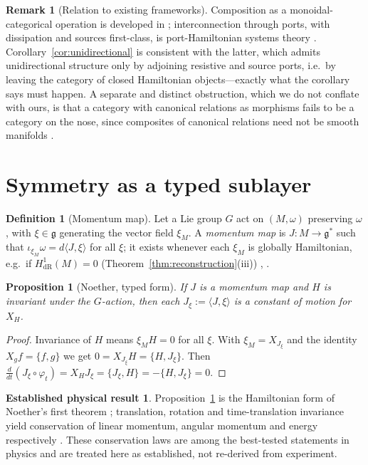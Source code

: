 \documentclass[10pt,a4paper]{article}
\theoremstyle{plain}
\newtheorem{proposition}[theorem]{Proposition}
\theoremstyle{definition}
\newtheorem{definition}[theorem]{Definition}
\newtheorem{established}[theorem]{Established physical result}
\newtheorem{remark}[theorem]{Remark}
\newcommand{\dR}{\mathrm{dR}}
\newcommand{\ins}{\iota}
\newcommand{\PB}[2]{\{#1,#2\}}
\begin{document}
\begin{remark}[Relation to existing frameworks]
\label{rem:related}
Composition as a monoidal-categorical operation is developed in \cite{BaezStay2011,CoeckeKissinger2017,FongSpivak2019}; interconnection through ports, with dissipation and sources first-class, is port-Hamiltonian systems theory \cite{vanderSchaftJeltsema2014}. Corollary~\ref{cor:unidirectional} is consistent with the latter, which admits unidirectional structure only by adjoining resistive and source ports, i.e.\ by leaving the category of closed Hamiltonian objects---exactly what the corollary says must happen. A separate and distinct obstruction, which we do not conflate with ours, is that a category with canonical relations as morphisms fails to be a category on the nose, since composites of canonical relations need not be smooth manifolds \cite{Weinstein2010}.
\end{remark}

\section{Symmetry as a typed sublayer}
\label{sec:symmetry}

\begin{definition}[Momentum map]
\label{def:momentum}
Let a Lie group $G$ act on $(M,\omega)$ preserving $\omega$, with $\xi \in \mathfrak{g}$ generating the vector field $\xi_M$. A \emph{momentum map} is $J: M \to \mathfrak{g}^*$ such that $\ins_{\xi_M}\omega = d\langle J,\xi\rangle$ for all $\xi$; it exists whenever each $\xi_M$ is globally Hamiltonian, e.g.\ if $H^1_{\dR}(M) = 0$ (Theorem~\ref{thm:reconstruction}(iii)) \cite[Ch.~11--12]{MarsdenRatiu1999}, \cite{Souriau1970}.
\end{definition}

\begin{proposition}[Noether, typed form]
\label{prop:noether}
If $J$ is a momentum map and $H$ is invariant under the $G$-action, then each $J_\xi := \langle J,\xi\rangle$ is a constant of motion for $X_H$.
\end{proposition}
\begin{proof}
Invariance of $H$ means $\xi_M H = 0$ for all $\xi$. With $\xi_M = X_{J_\xi}$ and the identity $X_g f = \PB{f}{g}$ we get $0 = X_{J_\xi}H = \PB{H}{J_\xi}$. Then $\frac{d}{dt}(J_\xi\circ\varphi_t) = X_H J_\xi = \PB{J_\xi}{H} = -\PB{H}{J_\xi} = 0$.
\end{proof}

\begin{established}
\label{est:noether}
Proposition~\ref{prop:noether} is the Hamiltonian form of Noether's first theorem \cite{Noether1918}; translation, rotation and time-translation invariance yield conservation of linear momentum, angular momentum and energy respectively \cite[Ch.~11]{MarsdenRatiu1999}. These conservation laws are among the best-tested statements in physics and are treated here as established, not re-derived from experiment.
\end{established}
\end{document}
